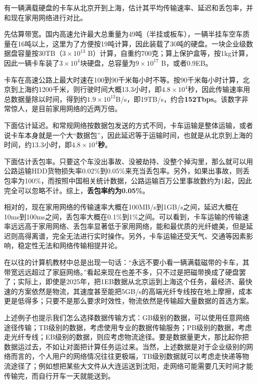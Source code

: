 \begin{example}
  有一辆满载硬盘的卡车从北京开到上海，估计其平均传输速率、延迟和丢包率，并和现在家用网络进行对比。
\end{example}

\begin{answer}
  先估算带宽。国内高速允许最大总重量为49吨（半挂或板车），一辆半挂车空车质量在16吨以上，这里为了方便按19吨计算，因此装载了30吨的硬盘。一块企业级数据盘容量按30TB（$3\times 10^{13}$ B）计算，自重约700克；算上保护盒等，按1kg计算，因此一辆卡车装了$3\times 10^4$块硬盘，总容量为$9\times 10^{17}$ B，或者0.9EB。

  卡车在高速公路上最大时速在100到90千米每小时不等。按90千米每小时计算，北京到上海约1200千米，则行驶时间大概13.3小时，即$4.8\times 10^4$秒，因此传输速率用总数据量除以时间，得到约$1.9\times 10^{13}$B/s，即19TB/s，约合\textbf{152Tbps}。该数字非常惊人，是目前家用网络的近两万倍。

  下面估计延迟。和常规网络按数据包发送的方式不同，卡车运输是整体运输，或者说卡车本身就是一个大“数据包”，因此延迟等于运输时间，也就是从北京到上海的时间，约13.3小时，即\textbf{$4.8\times 10^4$秒}。

  下面估计丢包率。只要这个车没出事故、没被劫持、没整个掉沟里，那么就可以用公路运输HDD货物损失率0.02\%到0.05\%来充当丢包率。另外，如果出事故，则丢包率为100\%，而按照中国相关统计数据，公路运输百万公里事故数约为1起，因此完全可以忽略不计。综上，\textbf{丢包率约为0.05\%}。

  相对的，现在家用网络的传输速率大概在100MB/s到1GB/s之间，延迟大概在10ms到100ms之间，丢包率大概在0.1\%到1\%之间。可以看到，卡车运输的传输速率远远高于家用网络、丢包率显著低于家用网络，能和最优质的光纤媲美，但是延迟则高得离谱，完全无法进行实时操作。另外，卡车运输还受天气、交通等因素影响，稳定性无法和网络传输相提并论。
\end{answer}

在以往的计算机教材中总是出现一句话：“永远不要小看一辆满载磁带的卡车，其带宽远远超过了家庭网络。”看起来现在也差不多，只不过是把磁带换成了硬盘罢了；实际上，即使是2025年，把1EB数据从北京运到上海这个任务，最经济、最快速的方案依然是物流，其速度甚至能把5GB/s的高端光纤专线按在地上摩擦，成本更是低得多；只要不是那么要求时效性，物流依然是传输超大量数据的首选方案。

上述例子也提示我们怎么选择数据传输方式：GB级别的数据，可以使用任意网络途径传输；TB级别的数据，考虑使用专业的数据传输服务；PB级别的数据，考虑走光纤专线；EB级别的数据，则应考虑物流途径。要是数据量更大，那比起你把数据运过去，不如让对面把计算任务运过来。当然，上述数据是对于企业级别的网络而言的，个人用户的网络情况往往更极端，TB级别数据就可以考虑走快递等物流途径了；例如想把某些大文件从大连运送到沈阳，走网络可能需要几天时间才能传输完，而自行开车一天就能送到。

